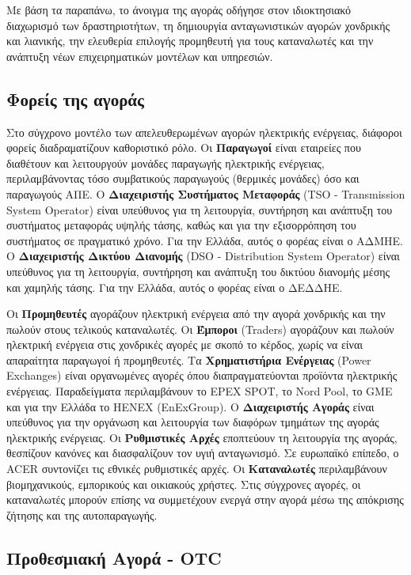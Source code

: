 Με βάση τα παραπάνω, το άνοιγμα της αγοράς οδήγησε στον ιδιοκτησιακό διαχωρισμό των δραστηριοτήτων, τη δημιουργία ανταγωνιστικών αγορών χονδρικής και λιανικής, την ελευθερία επιλογής προμηθευτή για τους καταναλωτές και την ανάπτυξη νέων επιχειρηματικών μοντέλων και υπηρεσιών.

\subsection{Φορείς της αγοράς}
\label{subsec:market-participants}

Στο σύγχρονο μοντέλο των απελευθερωμένων αγορών ηλεκτρικής ενέργειας, διάφοροι φορείς διαδραματίζουν καθοριστικό ρόλο. Οι \textbf{Παραγωγοί} είναι εταιρείες που διαθέτουν και λειτουργούν μονάδες παραγωγής ηλεκτρικής ενέργειας, περιλαμβάνοντας τόσο συμβατικούς παραγωγούς (θερμικές μονάδες) όσο και παραγωγούς ΑΠΕ. Ο \textbf{Διαχειριστής Συστήματος Μεταφοράς} (TSO - Transmission System Operator) είναι υπεύθυνος για τη λειτουργία, συντήρηση και ανάπτυξη του συστήματος μεταφοράς υψηλής τάσης, καθώς και για την εξισορρόπηση του συστήματος σε πραγματικό χρόνο. Για την Ελλάδα, αυτός ο φορέας είναι ο ΑΔΜΗΕ. Ο \textbf{Διαχειριστής Δικτύου Διανομής} (DSO - Distribution System Operator) είναι υπεύθυνος για τη λειτουργία, συντήρηση και ανάπτυξη του δικτύου διανομής μέσης και χαμηλής τάσης. Για την Ελλάδα, αυτός ο φορέας είναι ο ΔΕΔΔΗΕ.

Οι \textbf{Προμηθευτές} αγοράζουν ηλεκτρική ενέργεια από την αγορά χονδρικής και την πωλούν στους τελικούς καταναλωτές. Οι \textbf{Έμποροι} (Traders) αγοράζουν και πωλούν ηλεκτρική ενέργεια στις χονδρικές αγορές με σκοπό το κέρδος, χωρίς να είναι απαραίτητα παραγωγοί ή προμηθευτές. Τα \textbf{Χρηματιστήρια Ενέργειας} (Power Exchanges) είναι οργανωμένες αγορές όπου διαπραγματεύονται προϊόντα ηλεκτρικής ενέργειας. Παραδείγματα περιλαμβάνουν το EPEX SPOT, το Nord Pool, το GME και για την Ελλάδα το HENEX (EnExGroup). Ο \textbf{Διαχειριστής Αγοράς} είναι υπεύθυνος για την οργάνωση και λειτουργία των διαφόρων τμημάτων της αγοράς ηλεκτρικής ενέργειας. Οι \textbf{Ρυθμιστικές Αρχές} εποπτεύουν τη λειτουργία της αγοράς, θεσπίζουν κανόνες και διασφαλίζουν τον υγιή ανταγωνισμό. Σε ευρωπαϊκό επίπεδο, ο ACER συντονίζει τις εθνικές ρυθμιστικές αρχές. Οι \textbf{Καταναλωτές} περιλαμβάνουν βιομηχανικούς, εμπορικούς και οικιακούς χρήστες. Στις σύγχρονες αγορές, οι καταναλωτές μπορούν επίσης να συμμετέχουν ενεργά στην αγορά μέσω της απόκρισης ζήτησης και της αυτοπαραγωγής.

\subsection{Προθεσμιακή Αγορά - OTC}
\label{subsec:forward-market}

